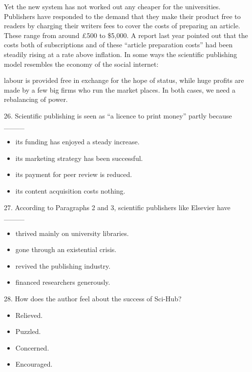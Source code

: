 \documentclass[UTF8,11pt]{ctexart}
\begin{document}
Yet the new system has not worked out any cheaper for the universities. Publishers have responded to the demand that they make their product free to readers by charging their writers fees to cover the costs of preparing an article. These range from around £500 to \$5,000. A report last year pointed out that the costs both of subscriptions and of these “article preparation costs” had been steadily rising at a rate above inflation. In some ways the scientific publishing model resembles the economy of the social internet:


labour is provided free in exchange for the hope of status, while huge profits are made by a few big firms who run the market places. In both cases, we need a rebalancing of power.


26. Scientific publishing is seen as “a licence to print money” partly because \_\_\_\_


\begin{itemize}[leftmargin=2em,itemsep=.2em,topsep=.4em]\item[A.] its funding has enjoyed a steady increase.
\item[B.] its marketing strategy has been successful.
\item[C.] its payment for peer review is reduced.
\item[D.] its content acquisition costs nothing.
\end{itemize}

27. According to Paragraphs 2 and 3, scientific publishers like Elsevier have \_\_\_\_


\begin{itemize}[leftmargin=2em,itemsep=.2em,topsep=.4em]\item[A.] thrived mainly on university libraries.
\item[B.] gone through an existential crisis.
\item[C.] revived the publishing industry.
\item[D.] financed researchers generously.
\end{itemize}

28. How does the author feel about the success of Sci-Hub?


\begin{itemize}[leftmargin=2em,itemsep=.2em,topsep=.4em]\item[A.] Relieved.
\item[B.] Puzzled.
\item[C.] Concerned.
\item[D.] Encouraged.
\end{itemize}
\end{document}
